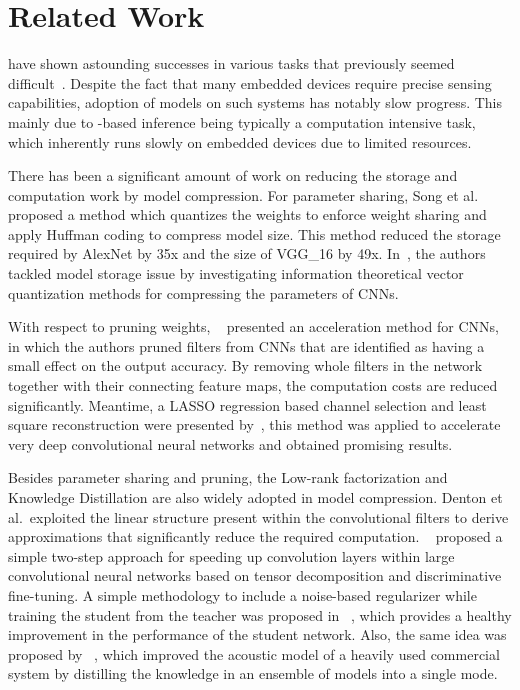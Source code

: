 \section{Related Work}
\DNNs have shown astounding successes in various tasks that previously seemed difficult~\cite{cho2014learning}. Despite the fact that many embedded
devices require precise sensing capabilities, adoption of \DNN models on such systems has notably slow progress. This mainly due to
\DNN-based inference being typically a computation intensive task, which inherently runs slowly on embedded devices due to limited
resources.

There has been a significant amount of work on reducing the storage and computation work by model compression.
For parameter sharing, Song et al.~\cite{han2015deep} proposed a method which quantizes the weights to enforce weight sharing and apply Huffman coding to compress model size. 
This method reduced the storage required by AlexNet by 35x and the size of VGG\_16 by 49x. In~\cite{Gong2014Compressing}, 
the authors tackled model storage issue by investigating information theoretical vector quantization methods for compressing the parameters of CNNs.

With respect to pruning weights, ~\cite{Li2016Pruning} presented an acceleration method for CNNs, in which the authors pruned filters from CNNs that are identified as having a small effect on the output accuracy. By removing whole filters in the network together with their connecting feature maps, the computation costs are reduced significantly. Meantime, a LASSO regression based channel selection and least square reconstruction were presented by~\cite{he2017channel}, this method was applied to accelerate very deep convolutional neural networks and obtained promising results.

Besides parameter sharing and pruning, the Low-rank factorization and Knowledge Distillation are also widely adopted in model compression. Denton et al.~\cite{denton2014exploiting}exploited the linear structure present within the convolutional filters to derive approximations that significantly reduce the required computation. ~\cite{lebedev2014speeding} proposed a simple two-step approach for speeding up convolution layers within large convolutional neural networks based on tensor decomposition and discriminative fine-tuning. A simple methodology to include a noise-based regularizer while training the student from the teacher was proposed in ~\cite{Sau2016Deep}, which provides a healthy improvement in the performance of the student network. Also, the same idea was proposed by ~\cite{Hinton2015Distilling}, which improved the acoustic model of a heavily used commercial system by distilling the knowledge in an ensemble of models into a single mode.



